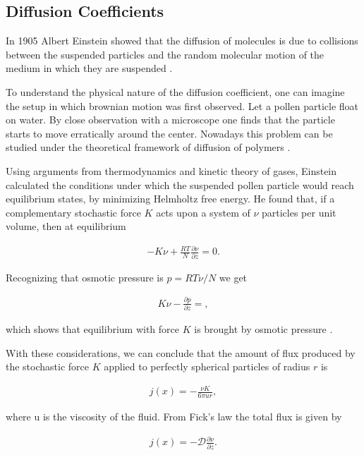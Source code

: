 \subsection{Diffusion Coefficients}

In 1905 Albert Einstein showed that the diffusion of molecules is due to collisions between the suspended particles and the random molecular motion of the medium in which they are suspended \cite{einstein}. 

To understand the physical nature of the diffusion coefficient, one can imagine the setup in which brownian motion was first observed. Let a pollen particle float on water. By close observation with a microscope one finds that the particle starts to move erratically around the center. Nowadays this problem can be studied under the theoretical framework of diffusion of polymers \cite{bird}.

Using arguments from thermodynamics and kinetic theory of gases, Einstein calculated the conditions under which the suspended pollen particle would reach equilibrium states, by minimizing Helmholtz free energy. He found that, if a complementary stochastic force $K$ acts upon a system of $\nu$ particles per unit volume, then at equilibrium

\begin{align}
	-K\nu +\frac{RT}{N}\frac{\partial \nu}{\partial z} = 0.
\end{align} 

Recognizing that osmotic pressure is $p = RT \nu /N$ we get

\begin{align}
\label{eq:einstein-result}
	K\nu - \frac{\partial p}{\partial z} = ,
\end{align}

which shows that equilibrium with force $K$ is brought by osmotic pressure \cite{einstein}. 

With these considerations, we can conclude that the amount of flux produced by the stochastic force $K$ applied to perfectly spherical particles of radius $r$ is

\begin{align}
	\label{flux}
	j(x) = -\frac{\nu K}{6\pi u r},
\end{align}

where u is the viscosity of the fluid. From Fick's law the total flux is given by

\begin{align}
	\label{flux-def}
	j(x) = -\mathcal{D}\frac{\partial \nu}{\partial z}.
\end{align}

